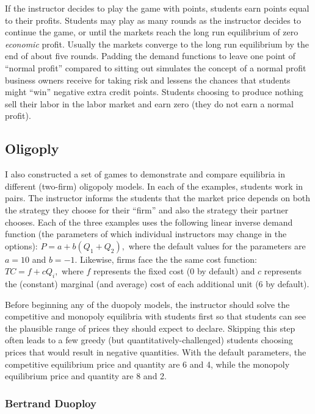 \documentclass[
]{article}
\begin{document}
If the instructor decides to play the game with points, students earn
points equal to their profits. Students may play as many rounds as the
instructor decides to continue the game, or until the markets reach the
long run equilibrium of zero \emph{economic} profit. Usually the markets
converge to the long run equilibrium by the end of about five rounds.
Padding the demand functions to leave one point of ``normal profit''
compared to sitting out simulates the concept of a normal profit
business owners receive for taking risk and lessens the chances that
students might ``win'' negative extra credit points. Students choosing
to produce nothing sell their labor in the labor market and earn zero
(they do not earn a normal profit).

\hypertarget{oligoply}{%
\subsection{Oligoply}\label{oligoply}}

I also constructed a set of games to demonstrate and compare equilibria
in different (two-firm) oligopoly models. In each of the examples,
students work in pairs. The instructor informs the students that the
market price depends on both the strategy they choose for their ``firm''
and also the strategy their partner chooses. Each of the three examples
uses the following linear inverse demand function (the parameters of
which individual instructors may change in the options):
\(P = a + b(Q_1 + Q_2),\) where the default values for the parameters
are \(a = 10\) and \(b = -1\). Likewise, firms face the the same cost
function: \(TC = f + cQ_i,\) where \(f\) represents the fixed cost (0 by
default) and \(c\) represents the (constant) marginal (and average) cost
of each additional unit (6 by default).

Before beginning any of the duopoly models, the instructor should solve
the competitive and monopoly equilibria with students first so that
students can see the plausible range of prices they should expect to
declare. Skipping this step often leads to a few greedy (but
quantitatively-challenged) students choosing prices that would result in
negative quantities. With the default parameters, the competitive
equilibrium price and quantity are 6 and 4, while the monopoly
equilibrium price and quantity are 8 and 2.

\hypertarget{bertrand-duoploy}{%
\subsubsection{Bertrand Duoploy}\label{bertrand-duoploy}}
\end{document}
